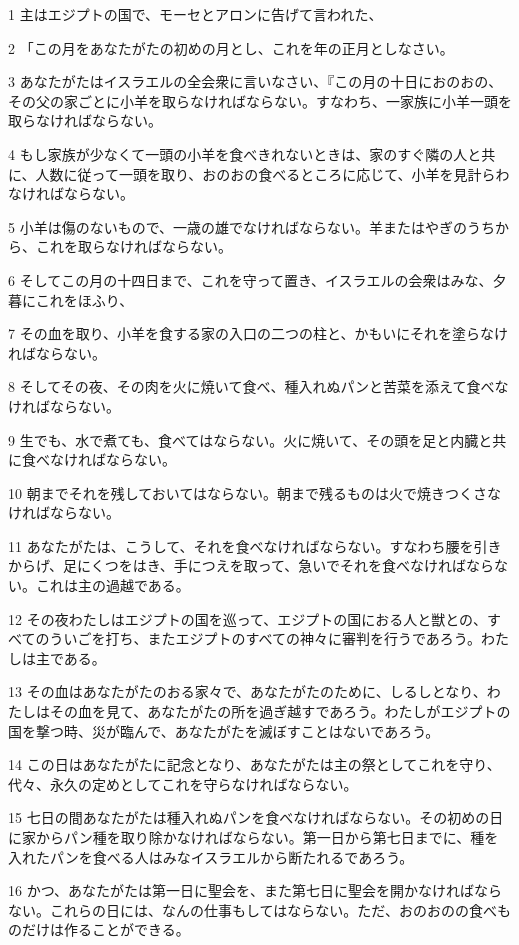 \par 1 主はエジプトの国で、モーセとアロンに告げて言われた、
\par 2 「この月をあなたがたの初めの月とし、これを年の正月としなさい。
\par 3 あなたがたはイスラエルの全会衆に言いなさい、『この月の十日におのおの、その父の家ごとに小羊を取らなければならない。すなわち、一家族に小羊一頭を取らなければならない。
\par 4 もし家族が少なくて一頭の小羊を食べきれないときは、家のすぐ隣の人と共に、人数に従って一頭を取り、おのおの食べるところに応じて、小羊を見計らわなければならない。
\par 5 小羊は傷のないもので、一歳の雄でなければならない。羊またはやぎのうちから、これを取らなければならない。
\par 6 そしてこの月の十四日まで、これを守って置き、イスラエルの会衆はみな、夕暮にこれをほふり、
\par 7 その血を取り、小羊を食する家の入口の二つの柱と、かもいにそれを塗らなければならない。
\par 8 そしてその夜、その肉を火に焼いて食べ、種入れぬパンと苦菜を添えて食べなければならない。
\par 9 生でも、水で煮ても、食べてはならない。火に焼いて、その頭を足と内臓と共に食べなければならない。
\par 10 朝までそれを残しておいてはならない。朝まで残るものは火で焼きつくさなければならない。
\par 11 あなたがたは、こうして、それを食べなければならない。すなわち腰を引きからげ、足にくつをはき、手につえを取って、急いでそれを食べなければならない。これは主の過越である。
\par 12 その夜わたしはエジプトの国を巡って、エジプトの国におる人と獣との、すべてのういごを打ち、またエジプトのすべての神々に審判を行うであろう。わたしは主である。
\par 13 その血はあなたがたのおる家々で、あなたがたのために、しるしとなり、わたしはその血を見て、あなたがたの所を過ぎ越すであろう。わたしがエジプトの国を撃つ時、災が臨んで、あなたがたを滅ぼすことはないであろう。
\par 14 この日はあなたがたに記念となり、あなたがたは主の祭としてこれを守り、代々、永久の定めとしてこれを守らなければならない。
\par 15 七日の間あなたがたは種入れぬパンを食べなければならない。その初めの日に家からパン種を取り除かなければならない。第一日から第七日までに、種を入れたパンを食べる人はみなイスラエルから断たれるであろう。
\par 16 かつ、あなたがたは第一日に聖会を、また第七日に聖会を開かなければならない。これらの日には、なんの仕事もしてはならない。ただ、おのおのの食べものだけは作ることができる。
